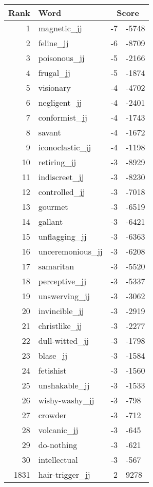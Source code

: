 \begin{longtable}[!htbp]{| rlr@{.}l |}
    \hline
    \textbf{Rank} & \textbf{Word} & \multicolumn{2}{c|}{\textbf{Score}} \\
    \hline
    \endhead
    1 & magnetic\_jj & -7 & -5748 \\
    2 & feline\_jj & -6 & -8709 \\
    3 & poisonous\_jj & -5 & -2166 \\
    4 & frugal\_jj & -5 & -1874 \\
    5 & visionary & -4 & -4702 \\
    6 & negligent\_jj & -4 & -2401 \\
    7 & conformist\_jj & -4 & -1743 \\
    8 & savant & -4 & -1672 \\
    9 & iconoclastic\_jj & -4 & -1198 \\
    10 & retiring\_jj & -3 & -8929 \\
    11 & indiscreet\_jj & -3 & -8230 \\
    12 & controlled\_jj & -3 & -7018 \\
    13 & gourmet & -3 & -6519 \\
    14 & gallant & -3 & -6421 \\
    15 & unflagging\_jj & -3 & -6363 \\
    16 & unceremonious\_jj & -3 & -6208 \\
    17 & samaritan & -3 & -5520 \\
    18 & perceptive\_jj & -3 & -5337 \\
    19 & unswerving\_jj & -3 & -3062 \\
    20 & invincible\_jj & -3 & -2919 \\
    21 & christlike\_jj & -3 & -2277 \\
    22 & dull-witted\_jj & -3 & -1798 \\
    23 & blase\_jj & -3 & -1584 \\
    24 & fetishist & -3 & -1560 \\
    25 & unshakable\_jj & -3 & -1533 \\
    26 & wishy-washy\_jj & -3 & -798 \\
    27 & crowder & -3 & -712 \\
    28 & volcanic\_jj & -3 & -645 \\
    29 & do-nothing & -3 & -621 \\
    30 & intellectual & -3 & -567 \\
    1831 & hair-trigger\_jj & 2 & 9278 \\

\end{longtable}
